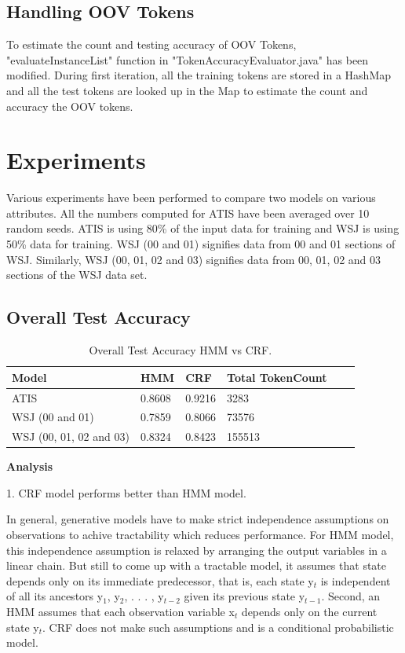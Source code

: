 \subsection {Handling OOV Tokens}

To estimate the count and testing accuracy of OOV Tokens, "evaluateInstanceList" function in "TokenAccuracyEvaluator.java" has been modified. During first iteration, all the training tokens are stored in a HashMap and all the test tokens are looked up in the Map to estimate the count and accuracy the OOV tokens.

\section {Experiments}

Various experiments have been performed to compare two models on various attributes. All the numbers computed for ATIS have been averaged over 10 random seeds. ATIS is using 80\% of the input data for training and WSJ is using 50\% data for training. WSJ (00 and 01) signifies data from 00 and 01 sections of WSJ. Similarly, WSJ (00, 01, 02 and 03) signifies data from 00, 01, 02 and 03 sections of the WSJ data set.

\subsection {Overall Test Accuracy}

\begin{center}	
	\begin{table}[ht]
  	\centering
   	\begin{tabular}{| l | l | l | l | l | l |}
    	\hline
        Model & HMM & CRF & Total TokenCount \\ \hline
        ATIS & 0.8608 & 0.9216 &  3283 \\ \hline
        WSJ (00 and 01) & 0.7859 & 0.8066 & 73576 \\ \hline
	WSJ (00, 01, 02 and 03) & 0.8324 & 0.8423 & 155513 \\ \hline
    	\end{tabular}
    	\caption{Overall Test Accuracy HMM vs CRF. }
    	\end{table}%
\end{center}

{\bfseries Analysis}

1. CRF model performs better than HMM model.

In general, generative models have to make strict independence assumptions on observations to achive tractability which reduces performance. For HMM model, this independence assumption is relaxed by arranging the output variables in a linear chain. But still to come up with a tractable model, it assumes that  state depends only on its immediate predecessor, that is, each state y$_t$ is independent of all its ancestors y$_1$, y$_2$, . . . , y$_{t-2}$ given its previous state y$_{t-1}$. Second, an HMM assumes that each observation variable x$_t$ depends only on the current state y$_t$. CRF does not make such assumptions and is a conditional probabilistic model.


